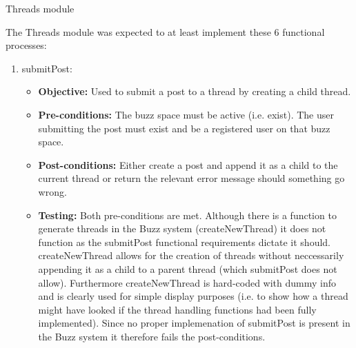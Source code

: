 \item Threads module
	
The Threads module was expected to at least implement these 6 functional processes:
	
\begin{enumerate}
	\item submitPost:
	\begin{itemize}
		\item\textbf{Objective: } Used to submit a post to a thread by creating a child thread.
		\item\textbf{Pre-conditions: } The buzz space must be active (i.e. exist). The user submitting the post must exist and be a registered user on that buzz space. 
		\item\textbf{Post-conditions: } Either create a post and append it as a child to the current thread or return the relevant error message should something go wrong.
		\item\textbf{Testing: } Both pre-conditions are met. Although there is a function to generate threads in the Buzz system (createNewThread) it does not function as the submitPost functional requirements dictate it should. createNewThread allows for the creation of threads without neccessarily appending it as a child to a parent thread (which submitPost does not allow). Furthermore createNewThread is hard-coded with dummy info and is clearly used for simple display purposes (i.e. to show how a thread might have looked if the thread handling functions had been fully implemented). Since no proper implemenation of submitPost is present in the Buzz system it therefore fails the post-conditions.


\end{itemize}
\end{enumerate}
